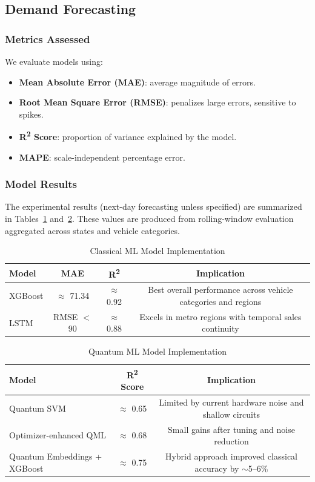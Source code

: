 \documentclass[pdflatex,sn-mathphys-num]{sn-jnl}%
\begin{document}
\subsection{Demand Forecasting}
\subsubsection{Metrics Assessed}
We evaluate models using:
\begin{itemize}
    \item \textbf{Mean Absolute Error (MAE)}: average magnitude of errors.
    \item \textbf{Root Mean Square Error (RMSE)}: penalizes large errors, sensitive to spikes.
    \item \textbf{R\textsuperscript{2} Score}: proportion of variance explained by the model.
    \item \textbf{MAPE}: scale-independent percentage error.
\end{itemize}

\subsubsection{Model Results}
The experimental results (next-day forecasting unless specified) are summarized in Tables~\ref{tab:classical_results} and~\ref{tab:quantum_results}. These values are produced from rolling-window evaluation aggregated across states and vehicle categories.

\begin{table}[h!]
    \centering
    \caption{Classical ML Model Implementation}\label{tab:classical_results}
    \begin{tabular}{lccc}
        \toprule
        Model & MAE & R\textsuperscript{2} & Implication \\
        \midrule
        XGBoost & $\approx$ 71.34 & $\approx$ 0.92 & Best overall performance across vehicle categories and regions \\
        LSTM & RMSE $<$ 90 & $\approx$ 0.88 & Excels in metro regions with temporal sales continuity \\
        \bottomrule
    \end{tabular}
\end{table}

\begin{table}[h!]
    \centering
    \caption{Quantum ML Model Implementation}\label{tab:quantum_results}
    \begin{tabular}{lcc}
        \toprule
        Model & R\textsuperscript{2} Score & Implication \\
        \midrule
        Quantum SVM & $\approx$ 0.65 & Limited by current hardware noise and shallow circuits \\
        Optimizer-enhanced QML & $\approx$ 0.68 & Small gains after tuning and noise reduction \\
        Quantum Embeddings + XGBoost & $\approx$ 0.75 & Hybrid approach improved classical accuracy by $\sim$5--6\% \\
        \bottomrule
    \end{tabular}
\end{table}
\end{document}
